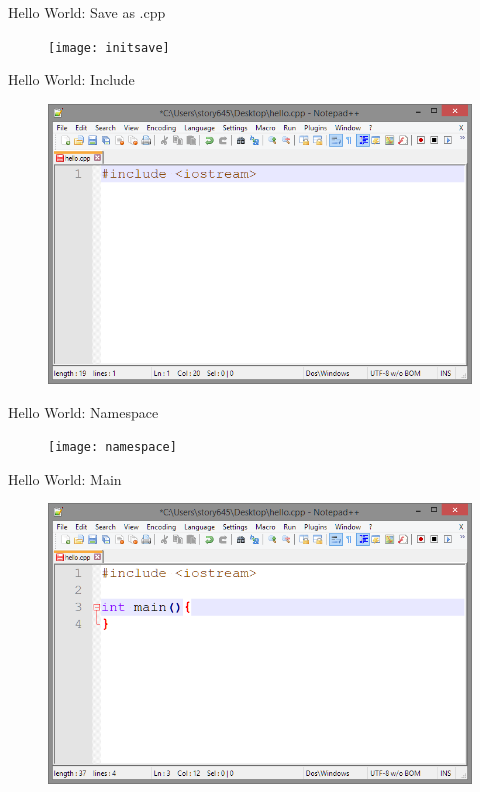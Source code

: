 \documentclass[xcolor={dvipsnames}]{beamer}
\begin{document}
\begin{frame}{Hello World: Save as .cpp}
	\begin{figure}
			\texttt{[image: initsave]}
	\end{figure}
\end{frame}
\begin{frame}{Hello World: Include}
	\begin{figure}
			\includegraphics[width=1\textwidth]{include}
	\end{figure}
\end{frame}

\begin{frame}{Hello World: Namespace}
	\begin{figure}
			\texttt{[image: namespace]}
	\end{figure}
\end{frame}

\begin{frame}{Hello World: Main}
	\begin{figure}
			\includegraphics[width=1\textwidth]{main}
	\end{figure}
\end{frame}
\end{document}
